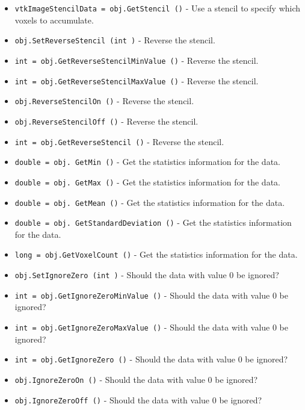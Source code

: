\begin{itemize}
\item  \verb|vtkImageStencilData = obj.GetStencil ()| -  Use a stencil to specify which voxels to accumulate.

\item  \verb|obj.SetReverseStencil (int )| -  Reverse the stencil.

\item  \verb|int = obj.GetReverseStencilMinValue ()| -  Reverse the stencil.

\item  \verb|int = obj.GetReverseStencilMaxValue ()| -  Reverse the stencil.

\item  \verb|obj.ReverseStencilOn ()| -  Reverse the stencil.

\item  \verb|obj.ReverseStencilOff ()| -  Reverse the stencil.

\item  \verb|int = obj.GetReverseStencil ()| -  Reverse the stencil.

\item  \verb|double = obj. GetMin ()| -  Get the statistics information for the data.

\item  \verb|double = obj. GetMax ()| -  Get the statistics information for the data.

\item  \verb|double = obj. GetMean ()| -  Get the statistics information for the data.

\item  \verb|double = obj. GetStandardDeviation ()| -  Get the statistics information for the data.

\item  \verb|long = obj.GetVoxelCount ()| -  Get the statistics information for the data.

\item  \verb|obj.SetIgnoreZero (int )| -  Should the data with value 0 be ignored?

\item  \verb|int = obj.GetIgnoreZeroMinValue ()| -  Should the data with value 0 be ignored?

\item  \verb|int = obj.GetIgnoreZeroMaxValue ()| -  Should the data with value 0 be ignored?

\item  \verb|int = obj.GetIgnoreZero ()| -  Should the data with value 0 be ignored?

\item  \verb|obj.IgnoreZeroOn ()| -  Should the data with value 0 be ignored?

\item  \verb|obj.IgnoreZeroOff ()| -  Should the data with value 0 be ignored?

\end{itemize}
